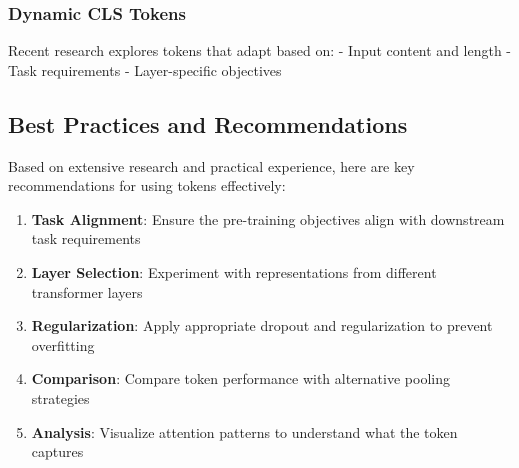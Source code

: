 \subsubsection{Dynamic CLS Tokens}
Recent research explores \cls{} tokens that adapt based on:
- Input content and length
- Task requirements
- Layer-specific objectives

\subsection{Best Practices and Recommendations}

Based on extensive research and practical experience, here are key recommendations for using \cls{} tokens effectively:

\begin{principle}
\begin{enumerate}
\item \textbf{Task Alignment}: Ensure the pre-training objectives align with downstream task requirements
\item \textbf{Layer Selection}: Experiment with \cls{} representations from different transformer layers
\item \textbf{Regularization}: Apply appropriate dropout and regularization to prevent overfitting
\item \textbf{Comparison}: Compare \cls{} token performance with alternative pooling strategies
\item \textbf{Analysis}: Visualize attention patterns to understand what the \cls{} token captures
\end{enumerate}
\end{principle}

